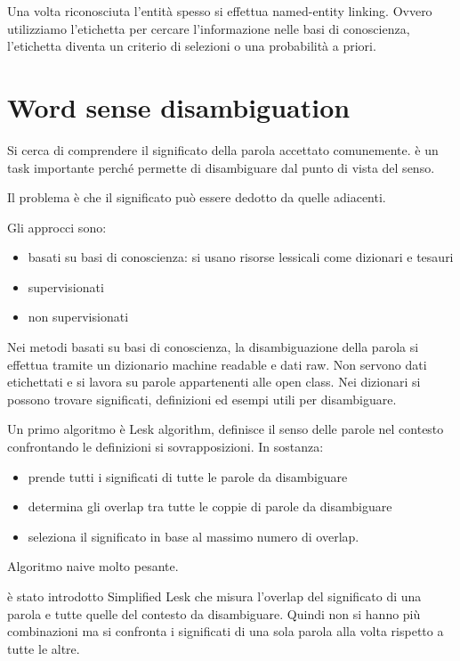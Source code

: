 Una volta riconosciuta l'entità spesso si effettua named-entity linking.
Ovvero utilizziamo l'etichetta per cercare l'informazione nelle basi di conoscienza,
l'etichetta diventa un criterio di selezioni o una probabilità a priori.

\section{Word sense disambiguation}
Si cerca di comprendere il significato della parola accettato comunemente. è un 
task importante perché permette di disambiguare dal punto di vista del senso.

Il problema è che il significato può essere dedotto da quelle adiacenti.

Gli approcci sono:
\begin{itemize}
      \item basati su basi di conoscienza: si usano risorse lessicali come 
      dizionari e tesauri
      \item supervisionati
      \item non supervisionati
\end{itemize}

Nei metodi basati su basi di conoscienza, la disambiguazione della parola si effettua 
tramite un dizionario machine readable e dati raw. Non servono dati etichettati e 
si lavora su parole appartenenti alle open class. Nei dizionari si possono trovare 
significati, definizioni ed esempi utili per disambiguare.

Un primo algoritmo è Lesk algorithm, definisce il senso delle parole nel contesto
confrontando le definizioni si sovrapposizioni. In sostanza:
\begin{itemize}
      \item prende tutti i significati di tutte le parole da disambiguare
      \item determina gli overlap tra tutte le coppie di parole da disambiguare
      \item seleziona il significato in base al massimo numero di overlap.
\end{itemize}
Algoritmo naive molto pesante.

è stato introdotto Simplified Lesk che misura l'overlap del significato di una 
parola e tutte quelle del contesto da disambiguare. Quindi non si hanno più combinazioni 
ma si confronta i significati di una sola parola alla volta rispetto a tutte le
altre.